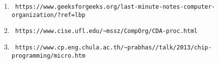 
\begin{enumerate}
    \item \begin{verbatim} https://www.geeksforgeeks.org/last-minute-notes-computer-organization/?ref=lbp \end{verbatim}

    \item \begin{verbatim} https://www.cise.ufl.edu/~mssz/CompOrg/CDA-proc.html \end{verbatim}

    \item \begin{verbatim} https://www.cp.eng.chula.ac.th/~prabhas//talk/2013/chip-programming/micro.htm \end{verbatim}
\end{enumerate}
